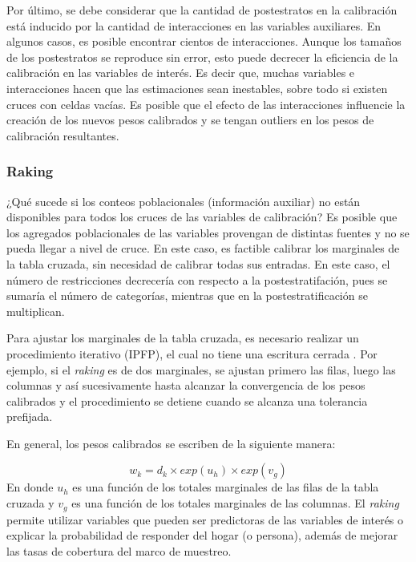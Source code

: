 \documentclass[
  10pt,
  spanish,
]{book}
\begin{document}
Por último, se debe considerar que la cantidad de postestratos en la calibración está inducido por la cantidad de interacciones en las variables auxiliares. En algunos casos, es posible encontrar cientos de interacciones. Aunque los tamaños de los postestratos se reproduce sin error, esto puede decrecer la eficiencia de la calibración en las variables de interés. Es decir que, muchas variables e interacciones hacen que las estimaciones sean inestables, sobre todo si existen cruces con celdas vacías. Es posible que el efecto de las interacciones influencie la creación de los nuevos pesos calibrados y se tengan outliers en los pesos de calibración resultantes.

\hypertarget{raking}{%
\subsubsection*{Raking}\label{raking}}

¿Qué sucede si los conteos poblacionales (información auxiliar) no están disponibles para todos los cruces de las variables de calibración? Es posible que los agregados poblacionales de las variables provengan de distintas fuentes y no se pueda llegar a nivel de cruce. En este caso, es factible calibrar los marginales de la tabla cruzada, sin necesidad de calibrar todas sus entradas. En este caso, el número de restricciones decrecería con respecto a la postestratifación, pues se sumaría el número de categorías, mientras que en la postestratificación se multiplican.

Para ajustar los marginales de la tabla cruzada, es necesario realizar un procedimiento iterativo (IPFP), el cual no tiene una escritura cerrada \citep[capítulo 10]{Gutierrez_2016}. Por ejemplo, si el \emph{raking} es de dos marginales, se ajustan primero las filas, luego las columnas y así sucesivamente hasta alcanzar la convergencia de los pesos calibrados y el procedimiento se detiene cuando se alcanza una tolerancia prefijada.

En general, los pesos calibrados se escriben de la siguiente manera:

\[w_k = d_k \times exp(u_h) \times exp(v_g)\]
En donde \(u_h\) es una función de los totales marginales de las filas de la tabla cruzada y \(v_g\) es una función de los totales marginales de las columnas. El \emph{raking} permite utilizar variables que pueden ser predictoras de las variables de interés o explicar la probabilidad de responder del hogar (o persona), además de mejorar las tasas de cobertura del marco de muestreo.
\end{document}
